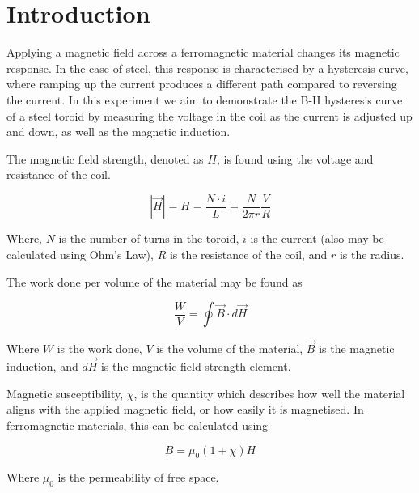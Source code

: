 \section{Introduction}



Applying a magnetic field across a ferromagnetic material changes its magnetic response.
In the case of steel, this response is characterised by a hysteresis curve, where ramping up the current produces a
different path compared to reversing the current.
In this experiment we aim to demonstrate the B-H hysteresis curve of a steel toroid by measuring the voltage in the 
coil as the current is adjusted up and down, as well as the magnetic induction.

The magnetic field strength, denoted as $H$, is found using the voltage and resistance of the coil.

\begin{equation}
            \label{eq:H}
    |\vec{H}| = H = \frac{N \cdot i}{L} = \frac{N}{2 \pi r} \frac{V}{R}
\end{equation}

Where, $N$ is the number of turns in the toroid, $i$ is the current (also may be calculated using Ohm's Law), $R$ is
the resistance of the coil, and $
r$ is the radius.

The work done per volume of the material may be found as

\begin{equation}
    \frac{W}{V} = \oint \vec{B} \cdot  d\vec{H} \label{eq:work}
\end{equation}

Where $W$ is the work done, $V$ is the volume of the material, $\vec{B}$ is the magnetic induction, and $d\vec{H}$ 
is the magnetic field strength element.

Magnetic susceptibility, $\chi$, is the quantity which describes how well the material aligns with the applied magnetic 
field, or how easily it is magnetised.
In ferromagnetic materials, this can be calculated using 

\begin{equation}
    B = \mu_0(1 + \chi) H\label{eq:chi}
\end{equation}

Where $\mu_0$ is the permeability of free space.

